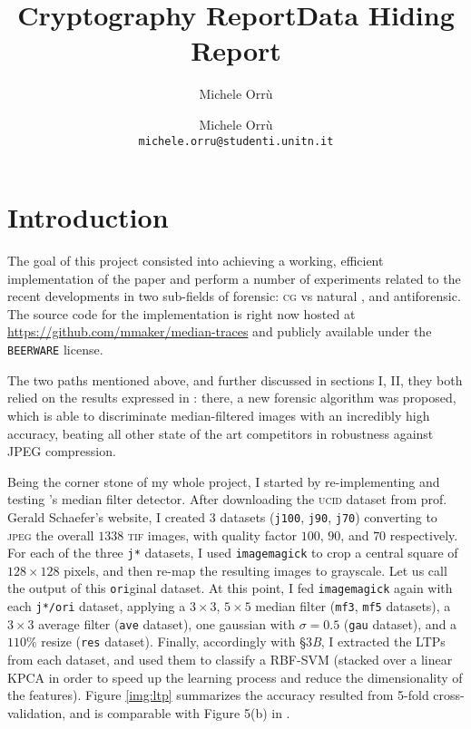 \documentclass[10pt,a4paper]{report}
\title{Cryptography Report}
\author{Michele Orr\`u}
\title{Data Hiding Report}
\author{
  Michele Orr\`u \\
  \small{\texttt{michele.orru@studenti.unitn.it}}
}
\date{}
\newcommand{\code}[1]{\texttt{#1}}
\begin{document}
\maketitle

\section{Introduction}

The goal of this project consisted into achieving a working, efficient
implementation of the paper \cite{mediantraces} and perform a number of
experiments related to the recent developments in two sub-fields of forensic:
\textsc{cg} vs natural \cite{splicing}, and antiforensic\cite{antiforensic}.
The source code for the implementation is right now hosted at
\url{https://github.com/mmaker/median-traces} and publicly available under the
\texttt{BEERWARE} license.

The two paths mentioned above, and further discussed in sections I, II,
they both relied on the results expressed in \cite{mediantraces}:
there, a new forensic algorithm was proposed, which is able to discriminate
median-filtered images with an incredibly high accuracy, beating all other state
of the art competitors in robustness against JPEG compression.

Being the corner stone of my whole project, I started by re-implementing and
testing \cite{mediantraces}'s median filter detector.
After downloading the \textsc{ucid} dataset from prof. Gerald Schaefer's
website, I created 3 datasets (\code{j100}, \code{j90}, \code{j70})
converting to \textsc{jpeg} the overall $1338$ \textsc{tif} images,
with quality factor $100$, $90$, and $70$ respectively.
For each of the three \code{j*} datasets, I used \code{imagemagick} to crop a
central square of $128 \times 128$ pixels, and then re-map the resulting images
to grayscale. Let us call the output of this \code{ori}ginal dataset.
At this point, I fed \code{imagemagick} again with each \code{j*/ori} dataset,
applying a $3 \times 3$, $5 \times 5$ median filter (\code{mf3}, \code{mf5}
datasets), a $3 \times 3$ average filter (\code{ave} dataset), one
gaussian with $\sigma = 0.5$ (\code{gau}
dataset), and a $110\%$ resize (\code{res} dataset).
Finally, accordingly with \cite{mediantraces} \S 3\textit{B}, I extracted the LTPs from each
dataset, and used them to classify a RBF-SVM (stacked over a linear KPCA in
order to speed up the learning process and reduce the dimensionality of the features).
Figure \ref{img:ltp} summarizes the accuracy resulted from 5-fold
cross-validation, and is comparable with Figure 5(b) in \cite{antiforensic}.
\end{document}
